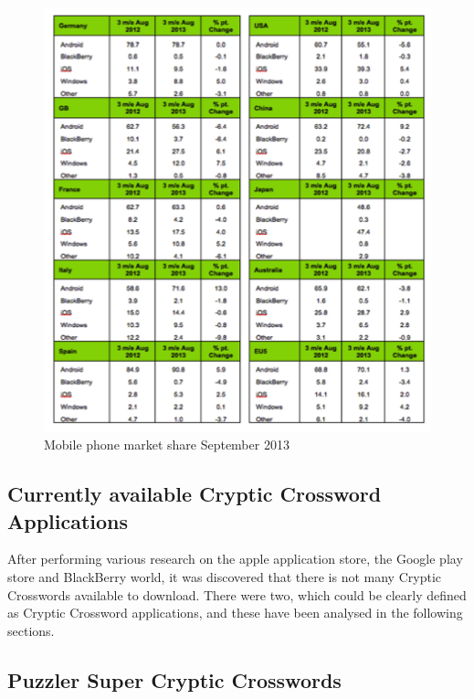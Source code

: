 \newpage
\begin{figure}[H]
  \centering
  \includegraphics[width=\linewidth]{forbeslist13.png}
  \caption{Mobile phone market share September 2013}
\end{figure}

\begin{flushright}
\citep{forbes13}
\end{flushright}

\subsection{Currently available Cryptic Crossword Applications}

After performing various research on the apple application store, the Google
play store and BlackBerry world, it was discovered that there is not many
Cryptic Crosswords available to download. There were two, which could be clearly
defined as Cryptic Crossword applications, and these have been analysed in the
following sections.

\subsection{Puzzler Super Cryptic Crosswords}

